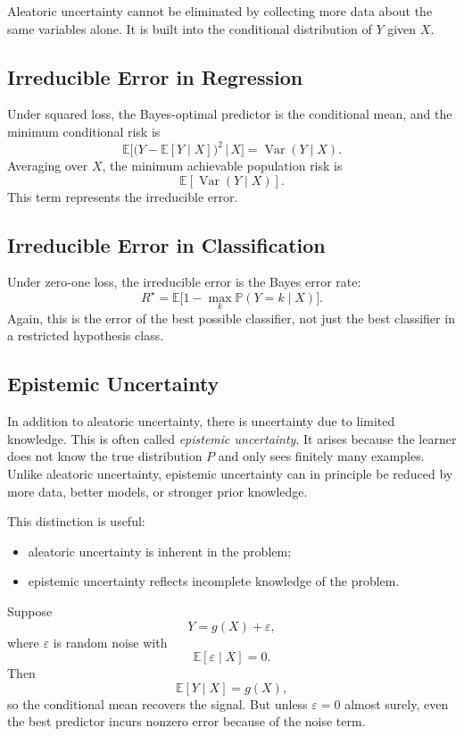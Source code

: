 Aleatoric uncertainty cannot be eliminated by collecting more data about the same variables alone. It is built into the conditional distribution of $Y$ given $X$.

\subsection{Irreducible Error in Regression}

Under squared loss, the Bayes-optimal predictor is the conditional mean, and the minimum conditional risk is
\[
\mathbb{E}\Big[\big(Y-\mathbb{E}[Y\mid X]\big)^2 \,\Big|\, X\Big]
= \operatorname{Var}(Y\mid X).
\]
Averaging over $X$, the minimum achievable population risk is
\[
\mathbb{E}[\operatorname{Var}(Y\mid X)].
\]
This term represents the irreducible error.

\subsection{Irreducible Error in Classification}

Under zero-one loss, the irreducible error is the Bayes error rate:
\[
R^\star = \mathbb{E}\Big[1-\max_k \mathbb{P}(Y=k\mid X)\Big].
\]
Again, this is the error of the best possible classifier, not just the best classifier in a restricted hypothesis class.

\subsection{Epistemic Uncertainty}

In addition to aleatoric uncertainty, there is uncertainty due to limited knowledge. This is often called \emph{epistemic uncertainty}. It arises because the learner does not know the true distribution $P$ and only sees finitely many examples. Unlike aleatoric uncertainty, epistemic uncertainty can in principle be reduced by more data, better models, or stronger prior knowledge.

This distinction is useful:
\begin{itemize}
    \item aleatoric uncertainty is inherent in the problem;
    \item epistemic uncertainty reflects incomplete knowledge of the problem.
\end{itemize}

\begin{example}
Suppose
\[
Y = g(X) + \varepsilon,
\]
where $\varepsilon$ is random noise with
\[
\mathbb{E}[\varepsilon\mid X]=0.
\]
Then
\[
\mathbb{E}[Y\mid X]=g(X),
\]
so the conditional mean recovers the signal. But unless $\varepsilon=0$ almost surely, even the best predictor incurs nonzero error because of the noise term.
\end{example}


